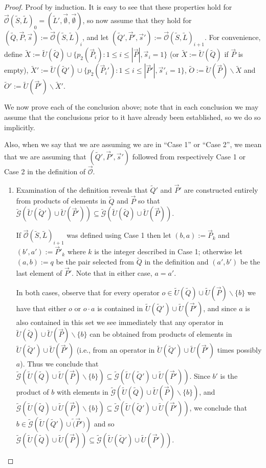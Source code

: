 \documentclass[12pt]{amsbook}
\theoremstyle{plain}
\theoremstyle{definition}
\theoremstyle{remark}
\newcommand{\lst}{\vec}
\newcommand{\set}{\tilde}
\newcommand{\genfun}{\tilde{\mathcal{G}}}
\newcommand{\unpack}{\set U}
\newcommand{\optimizer}{\lst{\mathcal{O}}}
\newcommand{\paren}[1]{\left(#1\right)}
\begin{document}
\begin{proof}
Proof by induction.  It is easy to see that these properties hold for $\optimizer(\set S,\set L)_0=(\set L',\lst\emptyset,\lst\emptyset)$, so now assume that they hold for $(\set Q,\lst P,\lst s):=\optimizer(\set S,\set L)_i$, and let $(\set Q',\lst P',\lst s'):=\optimizer(\set S,\set L)_{i+1}$.  For convenience, define $\set X:=\unpack(\set Q)\cup\{p_2(\lst P_i):1 \le i \le |\lst P|, \lst s_i=1\}$ (or $\set X:=\unpack(\set Q)$ if $\lst P$ is empty), $\set X':=\unpack(\set Q')\cup\{p_2(\lst P_i'):1 \le i \le |\lst P'|, \lst s'_i=1\}$, $\set O:=\unpack(\lst P)\backslash\set X$ and $\set O':=\unpack(\lst P')\backslash\set X'$.

We now prove each of the conclusion above;  note that in each conclusion we may assume that the conclusions prior to it have already been established, so we do so implicitly.

Also, when we say that we are assuming we are in ``Case 1'' or ``Case 2'', we mean that we are assuming that $(\set Q',\lst P',\lst s')$ followed from respectively Case 1 or Case 2 in the definition of $\optimizer$.

\begin{enumerate}
\item

Examination of the definition reveals that $\set Q'$ and $\lst P'$ are constructed entirely from products of elements in $\set Q$ and $\lst P$ so that $\genfun\paren{\set U(\set Q')\cup\set U(\lst P')}\subseteq\genfun\paren{\set U(\set Q)\cup\set U(\lst P)}$.

If $\optimizer(\set S,\set L)_{i+1}$ was defined using Case 1 then let $(b,a):=\lst P_k$ and $(b',a'):=\lst P'_k$ where $k$ is the integer described in Case 1;  otherwise let $(a,b):=q$ be the pair selected from $\set Q$ in the definition and $(a',b')$ be the last element of $\lst P'$.  Note that in either case, $a=a'$.

In both cases, observe that for every operator $o\in\set U(\set Q)\cup\set U(\lst P)\backslash\{b\}$ we have that either $o$ or $o\cdot a$ is contained in $\set U(\set Q')\cup\set U(\lst P')$, and since $a$ is also contained in this set we see immediately that any operator in $\set U(\set Q)\cup\set U(\lst P)\backslash\{b\}$ can be obtained from products of elements in $\set U(\set Q')\cup\set U(\lst P')$ (i.e., from an operator in $\set U(\set Q')\cup\set U(\lst P')$ times possibly $a$).  Thus we conclude that $\genfun\paren{\set U(\set Q)\cup\set U(\lst P)\backslash\{b\}}\subseteq\genfun\paren{\set U(\set Q')\cup\set U(\lst P')}$.  Since $b'$ is the product of $b$ with elements in $\genfun\paren{\set U(\set Q)\cup\set U(\lst P)\backslash\{b\}}$, and $\genfun\paren{\set U(\set Q)\cup\set U(\lst P)\backslash\{b\}}\subseteq\genfun\paren{\set U(\set Q')\cup\set U(\lst P')}$, we conclude that $b\in\genfun\paren{\set U(\set Q')\cup\set(\lst P')}$ and so $\genfun\paren{\set U(\set Q)\cup\set U(\lst P)}\subseteq\genfun\paren{\set U(\set Q')\cup\set U(\lst P')}$.


\end{enumerate}
\end{proof}
\end{document}
